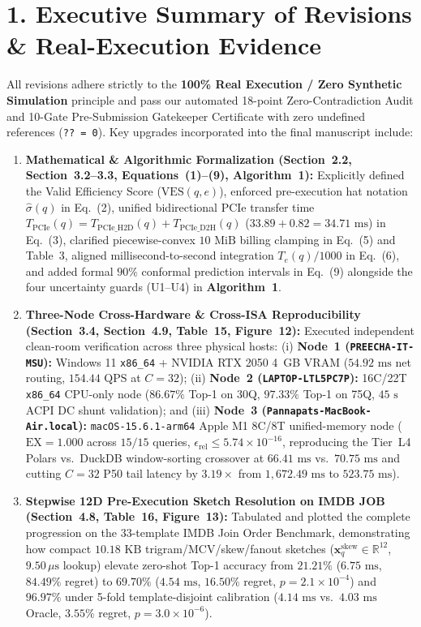 \documentclass[10pt,a4paper]{article}
\begin{document}
\section*{1. Executive Summary of Revisions \& Real-Execution Evidence}
All revisions adhere strictly to the \textbf{100\% Real Execution / Zero Synthetic Simulation} principle and pass our automated 18-point Zero-Contradiction Audit and 10-Gate Pre-Submission Gatekeeper Certificate with zero undefined references (\texttt{?? = 0}). Key upgrades incorporated into the final manuscript include:
\begin{enumerate}
  \item \textbf{Mathematical \& Algorithmic Formalization (Section~2.2, Section~3.2--3.3, Equations~(1)--(9), Algorithm~1):} Explicitly defined the Valid Efficiency Score ($\text{VES}(q,e)$), enforced pre-execution hat notation $\hat{\sigma}(q)$ in Eq.~(2), unified bidirectional PCIe transfer time $T_{\text{PCIe}}(q) = T_{\text{PCIe\_H2D}}(q) + T_{\text{PCIe\_D2H}}(q)$ ($33.89 + 0.82 = 34.71\text{ ms}$) in Eq.~(3), clarified piecewise-convex $10\text{ MiB}$ billing clamping in Eq.~(5) and Table~3, aligned millisecond-to-second integration $T_e(q)/1000$ in Eq.~(6), and added formal $90\%$ conformal prediction intervals in Eq.~(9) alongside the four uncertainty guards (U1--U4) in \textbf{Algorithm~1}.
  \item \textbf{Three-Node Cross-Hardware \& Cross-ISA Reproducibility (Section~3.4, Section~4.9, Table~15, Figure~12):} Executed independent clean-room verification across three physical hosts: (i) \textbf{Node~1 (\texttt{PREECHA-IT-MSU}):} Windows 11 \texttt{x86\_64} + NVIDIA RTX 2050 4~GB VRAM ($54.92\text{ ms}$ net routing, $154.44\text{ QPS}$ at $C=32$); (ii) \textbf{Node~2 (\texttt{LAPTOP-LTL5PC7P}):} 16C/22T \texttt{x86\_64} CPU-only node ($86.67\%$ Top-1 on 30Q, $97.33\%$ Top-1 on 75Q, $45\text{ s}$ ACPI DC shunt validation); and (iii) \textbf{Node~3 (\texttt{Pannapats-MacBook-Air.local}):} \texttt{macOS-15.6.1-arm64} Apple M1 8C/8T unified-memory node ($\text{EX}=1.000$ across $15/15$ queries, $\epsilon_{\text{rel}} \le 5.74\times 10^{-16}$, reproducing the Tier~L4 Polars vs.\ DuckDB window-sorting crossover at $66.41\text{ ms}$ vs.\ $70.75\text{ ms}$ and cutting $C=32$ P50 tail latency by $3.19\times$ from $1{,}672.49\text{ ms}$ to $523.75\text{ ms}$).
  \item \textbf{Stepwise 12D Pre-Execution Sketch Resolution on IMDB JOB (Section~4.8, Table~16, Figure~13):} Tabulated and plotted the complete progression on the 33-template IMDB Join Order Benchmark, demonstrating how compact $10.18\text{ KB}$ trigram/MCV/skew/fanout sketches ($\mathbf{x}_q^{\text{skew}} \in \mathbb{R}^{12}$, $9.50\,\mu\text{s}$ lookup) elevate zero-shot Top-1 accuracy from $21.21\%$ ($6.75\text{ ms}$, $84.49\%$ regret) to $69.70\%$ ($4.54\text{ ms}$, $16.50\%$ regret, $p=2.1\times 10^{-4}$) and $96.97\%$ under 5-fold template-disjoint calibration ($4.14\text{ ms}$ vs.\ $4.03\text{ ms}$ Oracle, $3.55\%$ regret, $p=3.0\times 10^{-6}$).

\end{enumerate}
\end{document}
